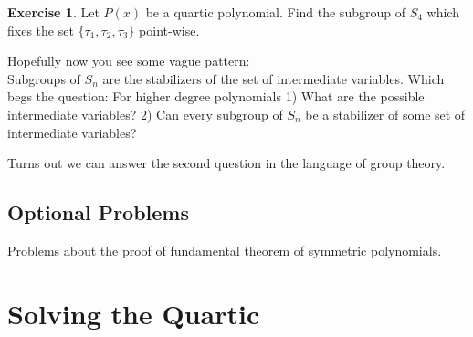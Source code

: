 \documentclass[reqno, 12pt, letter]{article}
\theoremstyle{plain}
\theoremstyle{definition}
\newtheorem{exercise}[theorem]{Exercise}
\theoremstyle{remark}
\numberwithin{equation}{section}
\begin{document}
		\begin{exercise}
			Let $ P(x)$ be a quartic polynomial. Find the subgroup of $ S_4$ which fixes the set $ \{ \tau_1,  \tau_2, \tau_3 \}$ point-wise.
		\end{exercise}
		
		Hopefully now you see some vague pattern:\\
		Subgroups of $ S_n$ are the stabilizers of the set of intermediate variables. Which begs the question: For higher degree polynomials 1) What are the possible intermediate variables? 2) Can every subgroup of $ S_n$ be a stabilizer of some set of intermediate variables?
		
		Turns out we can answer the second question in the language of group theory.
		
		
		
		
		\subsection{Optional Problems}
		Problems about the proof of fundamental theorem of symmetric polynomials.



\newpage
\section{Solving the Quartic}



\end{document}
